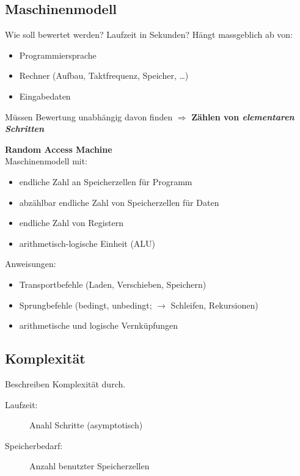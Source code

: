 \documentclass{scrartcl}
\begin{document}
\subsection{Maschinenmodell}
Wie soll bewertet werden? Laufzeit in Sekunden? Hängt massgeblich ab von:
\begin{itemize}
	\item Programmiersprache
	\item Rechner (Aufbau, Taktfrequenz, Speicher, \dots)
	\item Eingabedaten
\end{itemize}

Müssen Bewertung unabhängig davon finden $\Rightarrow$ \textbf{Zählen von \emph{elementaren Schritten}}

\begin{shaded}
\textbf{Random Access Machine} \\

Maschinenmodell mit:

\begin{itemize}
	\item endliche Zahl an Speicherzellen für Programm
	\item abzählbar endliche Zahl von Speicherzellen für Daten
	\item endliche Zahl von Registern
	\item arithmetisch-logische Einheit (ALU)
\end{itemize}

Anweisungen:

\begin{itemize}
	\item Transportbefehle (Laden, Verschieben, Speichern)
	\item Sprungbefehle (bedingt, unbedingt; $\to$ Schleifen, Rekursionen)
	\item arithmetische und logische Vernküpfungen
\end{itemize}

\end{shaded}

\subsection{Komplexität}
Beschreiben Komplexität durch.
\begin{description}
	\item[Laufzeit:] Anahl Schritte (asymptotisch)
	\item[Speicherbedarf:] Anzahl benutzter Speicherzellen
\end{description}
\end{document}
